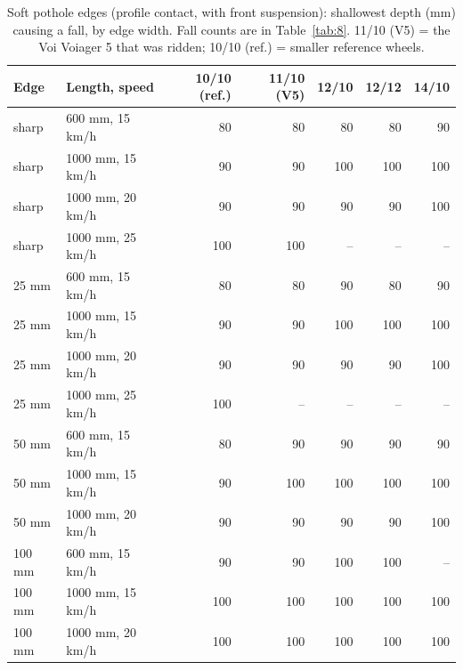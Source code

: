 \begin{table}[htbp]
\centering\small
\caption{Soft pothole edges (profile contact, with front suspension): shallowest depth (mm) causing a fall, by edge width. Fall counts are in Table~\ref{tab:8}. 11/10 (V5) = the Voi Voiager 5 that was ridden; 10/10 (ref.) = smaller reference wheels.}\label{tab:Eedges}
\begin{tabular}{@{}llrrrrr@{}}
\toprule
Edge & Length, speed & 10/10 (ref.) & 11/10 (V5) & 12/10 & 12/12 & 14/10 \\
\midrule
sharp & 600 mm, 15 km/h & 80 & 80 & 80 & 80 & 90 \\
sharp & 1000 mm, 15 km/h & 90 & 90 & 100 & 100 & 100 \\
sharp & 1000 mm, 20 km/h & 90 & 90 & 90 & 90 & 100 \\
sharp & 1000 mm, 25 km/h & 100 & 100 & -- & -- & -- \\
\midrule
25 mm & 600 mm, 15 km/h & 80 & 80 & 90 & 80 & 90 \\
25 mm & 1000 mm, 15 km/h & 90 & 90 & 100 & 100 & 100 \\
25 mm & 1000 mm, 20 km/h & 90 & 90 & 90 & 90 & 100 \\
25 mm & 1000 mm, 25 km/h & 100 & -- & -- & -- & -- \\
\midrule
50 mm & 600 mm, 15 km/h & 80 & 90 & 90 & 90 & 90 \\
50 mm & 1000 mm, 15 km/h & 90 & 100 & 100 & 100 & 100 \\
50 mm & 1000 mm, 20 km/h & 90 & 90 & 90 & 90 & 100 \\
\midrule
100 mm & 600 mm, 15 km/h & 90 & 90 & 100 & 100 & -- \\
100 mm & 1000 mm, 15 km/h & 100 & 100 & 100 & 100 & 100 \\
100 mm & 1000 mm, 20 km/h & 100 & 100 & 100 & 100 & 100 \\
\bottomrule
\end{tabular}
\end{table}
